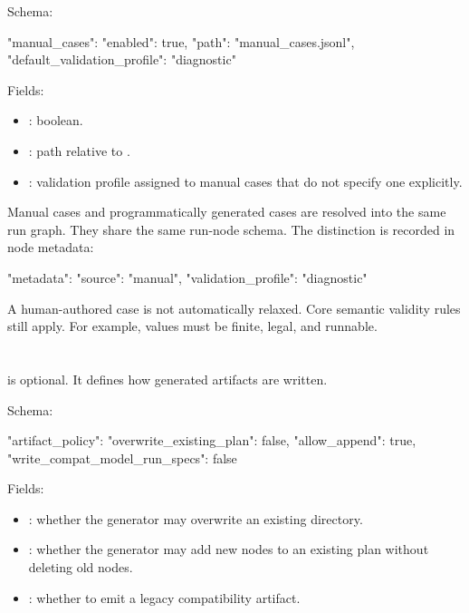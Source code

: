 \documentclass[11pt]{article}
\begin{document}
Schema:

\begin{DocCode}
"manual_cases": {
  "enabled": true,
  "path": "manual_cases.jsonl",
  "default_validation_profile": "diagnostic"
}
\end{DocCode}

Fields:

\begin{itemize}
    \item {}: boolean.
    \item {}: path relative to .
    \item {}: validation profile assigned to manual cases that do not specify one explicitly.
\end{itemize}

Manual cases and programmatically generated cases are resolved into the same run graph.
They share the same run-node schema.
The distinction is recorded in node metadata:

\begin{DocCode}
"metadata": {
  "source": "manual",
  "validation_profile": "diagnostic"
}
\end{DocCode}

A human-authored case is not automatically relaxed.
Core semantic validity rules still apply.
For example, values must be finite, legal, and runnable.

\section*{}

 is optional.
It defines how generated artifacts are written.

Schema:

\begin{DocCode}
"artifact_policy": {
  "overwrite_existing_plan": false,
  "allow_append": true,
  "write_compat_model_run_specs": false
}
\end{DocCode}

Fields:

\begin{itemize}
    \item {}: whether the generator may overwrite an existing  directory.
    \item {}: whether the generator may add new nodes to an existing plan without deleting old nodes.
    \item {}: whether to emit a legacy  compatibility artifact.
\end{itemize}
\end{document}
